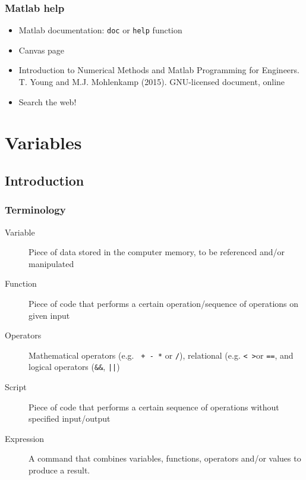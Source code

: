 \documentclass[11pt,table,final,fleqn,xcolor={usenames,dvipsnames},unknownkeysallowed,handout]{beamer}
\begin{document}
\begin{frame}
\frametitle{Matlab help}
\begin{itemize}[<+->]
  \item Matlab documentation: \lstinline$doc$ or \lstinline$help$ function
  \item Canvas page
  \item Introduction to Numerical Methods and Matlab Programming for Engineers. T. Young and M.J. Mohlenkamp (2015). GNU-licensed document, online
  \item Search the web!
\end{itemize}
\vspace{-2em}
\flushright{}
\end{frame}
%
\section{Variables}
\subsection*{Introduction}
\begin{frame}
 \frametitle{Terminology}
 \begin{description}
  \item[Variable] Piece of data stored in the computer memory, to be referenced and/or manipulated
  \item[Function] Piece of code that performs a certain operation/sequence of operations on given input
  \item[Operators] Mathematical operators (e.g. \lstinline$ + - *$ or \lstinline$/$), relational (e.g. \lstinline$< >$or \lstinline$==$, and logical operators (\lstinline$&&$, \lstinline$||$)
  \item[Script] Piece of code that performs a certain sequence of operations without specified input/output
  \item[Expression] A command that combines variables, functions, operators and/or values to produce a result.
 \end{description}
\end{frame}
\end{document}
